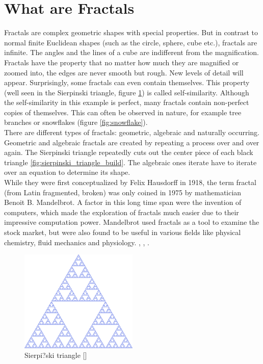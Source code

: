 \documentclass[10pt,a4paper,titlepage]{article}
\begin{document}
	\section{What are Fractals}
	Fractals are complex geometric shapes with special properties. But in contrast to normal finite Euclidean shapes (such as the circle, sphere, cube etc.), fractals are infinite. The angles and the lines of a cube are indifferent from the magnification. Fractals have the property that no matter how much they are magnified or zoomed into, the edges are never smooth but rough. New levels of detail will appear. Surprisingly, some fractals can even contain themselves. This property (well seen in the Sierpinski triangle, figure \ref{fig:sierpinski_triangle}) is called self-similarity. Although the self-similarity in this example is perfect, many fractals contain non-perfect copies of themselves. This can often be observed in nature, for example tree branches or snowflakes (figure \ref{fig:snowflake}).\\
	There are different types of fractals: geometric, algebraic and naturally occurring. Geometric and algebraic fractals are created by repeating a process over and over again. The Sierpinski triangle repeatedly cuts out the center piece of each black triangle \ref{fig:sierpinski_triangle_build}. The algebraic ones iterate have to iterate over an equation to determine its shape.\\
	While they were first conceptualized by Felix Hausdorff in 1918, the term fractal (from Latin fragmented, broken) was only coined in 1975 by mathematician Benoit B. Mandelbrot. A factor in this long time span were the invention of computers, which made the exploration of fractals much easier due to their impressive computation power. Mandelbrot used fractals as a tool to examine the stock market, but were also found to be useful in various fields like physical chemistry, fluid mechanics and physiology. \cite{FractalFoundation}, \cite{FractalFoundation}, \cite{britannica}.
	\begin{figure}[h]
		\caption{Sierpi?ski triangle [\cite{Sierpinski}]}
		\label{fig:sierpinski_triangle}
		\centering
		\includegraphics[width=0.5\textwidth]{"res/images/1000px-Sierpinski_triangle.svg.png"}
	\end{figure}
\end{document}
